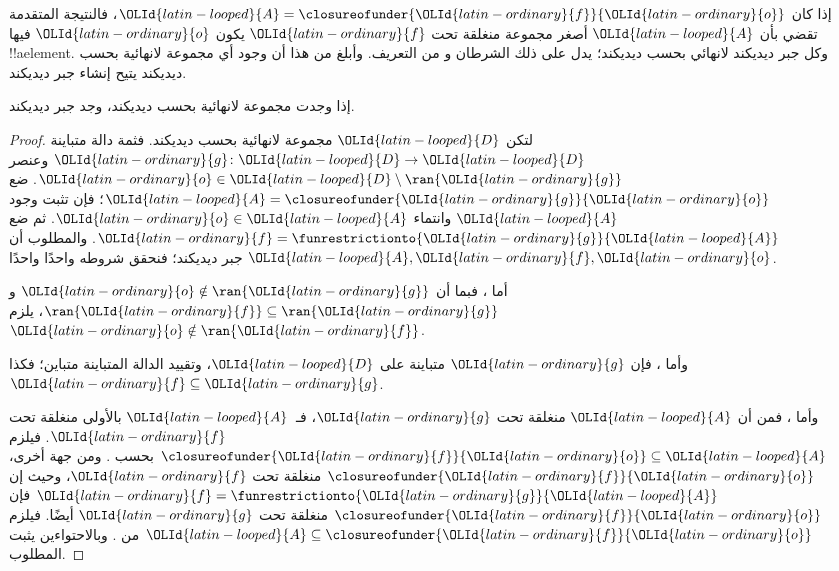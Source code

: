 \documentclass[../../../include/open-logic-section]{subfiles}
\begin{document}
إذا كان ${\OLId{latin-looped}{A}} = \closureofunder{{\OLId{latin-ordinary}{f}}}{{\OLId{latin-ordinary}{o}}}$، فالنتيجة المتقدمة تقضي بأن ${\OLId{latin-looped}{A}}$ أصغر مجموعة منغلقة تحت ${\OLId{latin-ordinary}{f}}$ يكون ${\OLId{latin-ordinary}{o}}$ فيها !!a{element}. وكل جبر ديديكند لانهائي بحسب ديديكند؛ يدل على ذلك الشرطان
 و من التعريف. وأبلغ من هذا أن وجود أي مجموعة لانهائية بحسب ديديكند يتيح إنشاء جبر ديديكند.

\begin{thm}
إذا وجدت مجموعة لانهائية بحسب ديديكند، وجد جبر ديديكند.
\end{thm}

\begin{proof}
لتكن ${\OLId{latin-looped}{D}}$ مجموعة لانهائية بحسب ديديكند. فثمة دالة متباينة ${\OLId{latin-ordinary}{g}} \colon {\OLId{latin-looped}{D}} \to
{\OLId{latin-looped}{D}}$ وعنصر ${\OLId{latin-ordinary}{o}}  \in {\OLId{latin-looped}{D}} \setminus \ran{{\OLId{latin-ordinary}{g}}}$. ضع ${\OLId{latin-looped}{A}} =
\closureofunder{{\OLId{latin-ordinary}{g}}}{{\OLId{latin-ordinary}{o}}}$؛ فإن  تثبت وجود ${\OLId{latin-looped}{A}}$ وانتماء
${\OLId{latin-ordinary}{o}} \in {\OLId{latin-looped}{A}}$. ثم ضع ${\OLId{latin-ordinary}{f}} =
\funrestrictionto{{\OLId{latin-ordinary}{g}}}{{\OLId{latin-looped}{A}}}$. والمطلوب أن ${\OLId{latin-looped}{A}}, {\OLId{latin-ordinary}{f}}, {\OLId{latin-ordinary}{o}}$ جبر ديديكند؛ فنحقق شروطه واحدًا واحدًا.

أما ، فبما أن ${\OLId{latin-ordinary}{o}} \notin \ran{{\OLId{latin-ordinary}{g}}}$ و$\ran{{\OLId{latin-ordinary}{f}}}
\subseteq \ran{{\OLId{latin-ordinary}{g}}}$، يلزم ${\OLId{latin-ordinary}{o}}\notin \ran{{\OLId{latin-ordinary}{f}}}$.

وأما ، فإن ${\OLId{latin-ordinary}{g}}$ متباينة على ${\OLId{latin-looped}{D}}$، وتقييد الدالة المتباينة متباين؛ فكذا ${\OLId{latin-ordinary}{f}} \subseteq {\OLId{latin-ordinary}{g}}$.

وأما ، فمن  أن ${\OLId{latin-looped}{A}}$ منغلقة تحت ${\OLId{latin-ordinary}{g}}$، فـ~${\OLId{latin-looped}{A}}$ بالأولى منغلقة تحت ${\OLId{latin-ordinary}{f}}$. فيلزم
$\closureofunder{{\OLId{latin-ordinary}{f}}}{{\OLId{latin-ordinary}{o}}} \subseteq {\OLId{latin-looped}{A}}$ بحسب .
ومن جهة أخرى، $\closureofunder{{\OLId{latin-ordinary}{f}}}{{\OLId{latin-ordinary}{o}}}$ منغلقة تحت ${\OLId{latin-ordinary}{f}}$، وحيث إن ${\OLId{latin-ordinary}{f}} =
\funrestrictionto{{\OLId{latin-ordinary}{g}}}{{\OLId{latin-looped}{A}}}$ فإن $\closureofunder{{\OLId{latin-ordinary}{f}}}{{\OLId{latin-ordinary}{o}}}$ منغلقة تحت ${\OLId{latin-ordinary}{g}}$ أيضًا. فيلزم
${\OLId{latin-looped}{A}} \subseteq \closureofunder{{\OLId{latin-ordinary}{f}}}{{\OLId{latin-ordinary}{o}}}$ من
. وبالاحتواءين يثبت المطلوب.
\end{proof}
\end{document}
